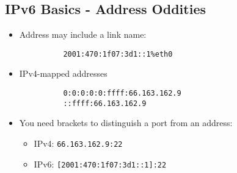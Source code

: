 \documentclass[xga]{xdvislides}
\begin{document}
\subsection{IPv6 Basics - Address Oddities}
\begin{itemize}
	\item Address may include a link name:
\begin{verbatim}
          2001:470:1f07:3d1::1%eth0
\end{verbatim}
	\item IPv4-mapped addresses
\begin{verbatim}
          0:0:0:0:0:ffff:66.163.162.9
          ::ffff:66.163.162.9
\end{verbatim}
	\item You need brackets to distinguish a port from an address:
		\begin{itemize}
			\item IPv4: \verb+66.163.162.9:22+
			\item IPv6: \verb+[2001:470:1f07:3d1::1]:22+
		\end{itemize}
\end{itemize}
\end{document}
